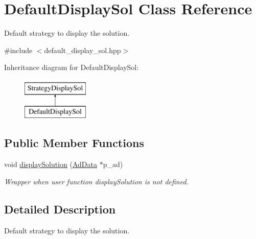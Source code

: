 \hypertarget{classDefaultDisplaySol}{\section{\-Default\-Display\-Sol \-Class \-Reference}
\label{classDefaultDisplaySol}
}


\-Default strategy to display the solution.  




{\ttfamily \#include $<$default\-\_\-display\-\_\-sol.\-hpp$>$}

\-Inheritance diagram for \-Default\-Display\-Sol\-:\begin{figure}[H]
\begin{center}
\leavevmode
\includegraphics[height=2.000000cm]{classDefaultDisplaySol}
\end{center}
\end{figure}
\subsection*{\-Public \-Member \-Functions}
\begin{DoxyCompactItemize}
\item 
void \hyperlink{classDefaultDisplaySol_ab80dde5db4b38e88dba892c5cf94c777}{display\-Solution} (\hyperlink{classAdData}{\-Ad\-Data} $\ast$p\-\_\-ad)
\begin{DoxyCompactList}\small\item\em \-Wrapper when user function display\-Solution is not defined. \end{DoxyCompactList}\end{DoxyCompactItemize}


\subsection{\-Detailed \-Description}
\-Default strategy to display the solution. 

